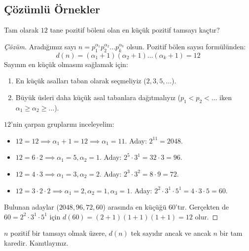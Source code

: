 \subsection{Çözümlü Örnekler}

\begin{example}
Tam olarak $12$ tane pozitif böleni olan en küçük pozitif tamsayı kaçtır?
\end{example}

\begin{proof}[Çözüm]
Aradığımız sayı $n = p_1^{\alpha_1} p_2^{\alpha_2} \dots p_k^{\alpha_k}$ olsun. Pozitif bölen sayısı formülünden:
\[ d(n) = (\alpha_1 + 1)(\alpha_2 + 1)\dots(\alpha_k + 1) = 12 \]
Sayının en küçük olmasını sağlamak için:
\begin{enumerate}
    \item En küçük asalları taban olarak seçmeliyiz ($2, 3, 5, \dots$).
    \item Büyük üsleri daha küçük asal tabanlara dağıtmalıyız ($p_1 < p_2 < \dots$ iken $\alpha_1 \ge \alpha_2 \ge \dots$).
\end{enumerate}
$12$'nin çarpan gruplarını inceleyelim:
\begin{itemize}
    \item $12 = 12 \implies \alpha_1 + 1 = 12 \implies \alpha_1 = 11$.
    Aday: $2^{11} = 2048$.
    \item $12 = 6 \cdot 2 \implies \alpha_1 = 5, \alpha_2 = 1$.
    Aday: $2^5 \cdot 3^1 = 32 \cdot 3 = 96$.
    \item $12 = 4 \cdot 3 \implies \alpha_1 = 3, \alpha_2 = 2$.
    Aday: $2^3 \cdot 3^2 = 8 \cdot 9 = 72$.
    \item $12 = 3 \cdot 2 \cdot 2 \implies \alpha_1 = 2, \alpha_2 = 1, \alpha_3 = 1$.
    Aday: $2^2 \cdot 3^1 \cdot 5^1 = 4 \cdot 3 \cdot 5 = 60$.
\end{itemize}
Bulunan adaylar ($2048, 96, 72, 60$) arasında en küçüğü $60$'tır.
Gerçekten de $60 = 2^2 \cdot 3^1 \cdot 5^1$ için $d(60) = (2+1)(1+1)(1+1) = 12$ olur.
\end{proof}

\begin{example}
$n$ pozitif bir tamsayı olmak üzere, $d(n)$ tek sayıdır ancak ve ancak $n$ bir tam karedir. Kanıtlayınız.
\end{example}

